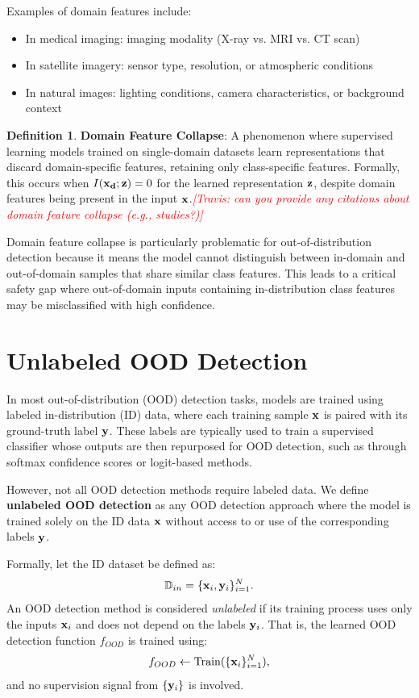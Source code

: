 \documentclass[11pt, oneside]{book}
\theoremstyle{plain}
\theoremstyle{definition}
\newtheorem{definition}[theorem]{Definition}
\theoremstyle{remark}
\newcommand{\travis}[1]{\textcolor{red}{{\it [Travis: #1]}}}
\begin{document}
Examples of domain features include:
\begin{itemize}
    \item In medical imaging: imaging modality (X-ray vs. MRI vs. CT scan)
    \item In satellite imagery: sensor type, resolution, or atmospheric conditions
    \item In natural images: lighting conditions, camera characteristics, or background context
\end{itemize}

\begin{definition}
\textbf{Domain Feature Collapse}: A phenomenon where supervised learning models trained on single-domain datasets learn representations that discard domain-specific features, retaining only class-specific features. Formally, this occurs when $I({\mathbf{x}}_{\mathbf{d}}; {\mathbf{z}}) = 0$ for the learned representation ${\mathbf{z}}$, despite domain features being present in the input ${\mathbf{x}}$.\travis{can you provide any citations about domain feature collapse (e.g., studies?)}
\label{def:domainfeaturecollapse}
\end{definition}

Domain feature collapse is particularly problematic for out-of-distribution detection because it means the model cannot distinguish between in-domain and out-of-domain samples that share similar class features. This leads to a critical safety gap where out-of-domain inputs containing in-distribution class features may be misclassified with high confidence.

\section{Unlabeled OOD Detection}

In most out-of-distribution (OOD) detection tasks, models are trained using labeled in-distribution (ID) data, where each training sample \( {\mathbf{x}} \) is paired with its ground-truth label \( {\mathbf{y}} \). These labels are typically used to train a supervised classifier whose outputs are then repurposed for OOD detection, such as through softmax confidence scores or logit-based methods.

However, not all OOD detection methods require labeled data. We define \textbf{unlabeled OOD detection} as any OOD detection approach where the model is trained solely on the ID data \( {\mathbf{x}} \) without access to or use of the corresponding labels \( {\mathbf{y}} \).

Formally, let the ID dataset be defined as:
\[
{\mathbb{D}}_{in} = \{ {\mathbf{x}}_i, {\mathbf{y}}_i \}_{i=1}^N.
\]
An OOD detection method is considered \emph{unlabeled} if its training process uses only the inputs \( {\mathbf{x}}_i \) and does not depend on the labels \( {\mathbf{y}}_i \). That is, the learned OOD detection function \( f_{OOD} \) is trained using:
\[
f_{OOD} \gets \mathrm{Train}(\{ {\mathbf{x}}_i \}_{i=1}^N),
\]
and no supervision signal from \( \{ {\mathbf{y}}_i \} \) is involved.
\end{document}

